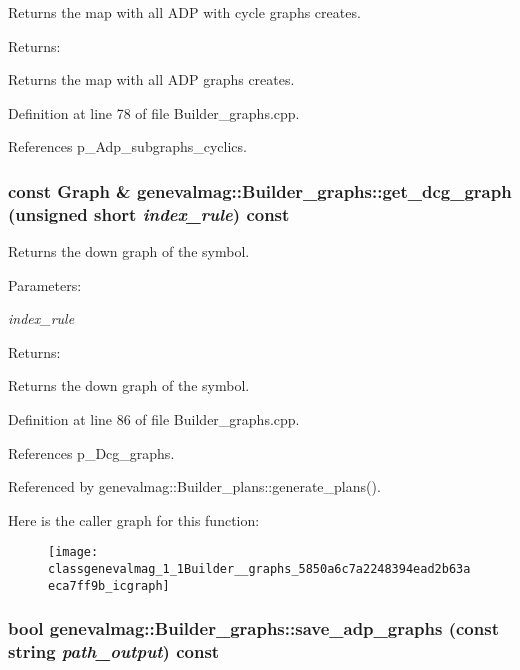 Returns the map with all ADP with cycle graphs creates. \begin{Desc}
\item[Returns:]\end{Desc}
Returns the map with all ADP graphs creates. 

Definition at line 78 of file Builder\_\-graphs.cpp.

References p\_\-Adp\_\-subgraphs\_\-cyclics.\hypertarget{classgenevalmag_1_1Builder__graphs_5850a6c7a2248394ead2b63aeca7ff9b}{
\subsubsection[{get\_\-dcg\_\-graph}]{\setlength{\rightskip}{0pt plus 5cm}const {\bf Graph} \& genevalmag::Builder\_\-graphs::get\_\-dcg\_\-graph (unsigned short {\em index\_\-rule}) const}}
\label{classgenevalmag_1_1Builder__graphs_5850a6c7a2248394ead2b63aeca7ff9b}


Returns the down graph of the symbol. \begin{Desc}
\item[Parameters:]
\begin{description}
\item[{\em index\_\-rule}]\end{description}
\end{Desc}
\begin{Desc}
\item[Returns:]\end{Desc}
Returns the down graph of the symbol. 

Definition at line 86 of file Builder\_\-graphs.cpp.

References p\_\-Dcg\_\-graphs.

Referenced by genevalmag::Builder\_\-plans::generate\_\-plans().

Here is the caller graph for this function:\nopagebreak
\begin{figure}[H]
\begin{center}
\leavevmode
\texttt{[image: classgenevalmag\_1\_1Builder\_\_graphs\_5850a6c7a2248394ead2b63aeca7ff9b\_icgraph]}
\end{center}
\end{figure}
\hypertarget{classgenevalmag_1_1Builder__graphs_af2e8aa86ea96212833d769110eeaebd}{
\subsubsection[{save\_\-adp\_\-graphs}]{\setlength{\rightskip}{0pt plus 5cm}bool genevalmag::Builder\_\-graphs::save\_\-adp\_\-graphs (const string {\em path\_\-output}) const}}
\label{classgenevalmag_1_1Builder__graphs_af2e8aa86ea96212833d769110eeaebd}


